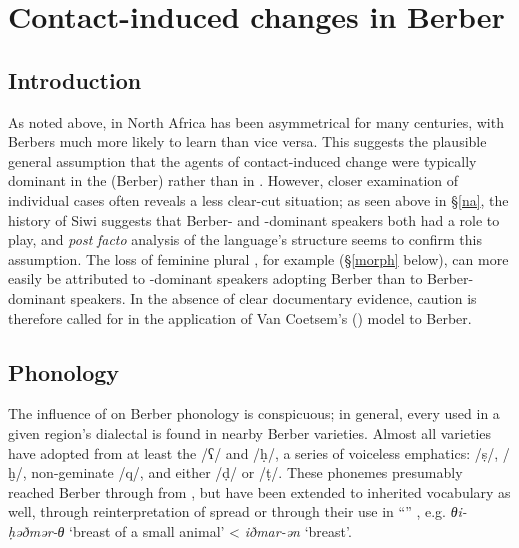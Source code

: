 \documentclass[output=paper]{langsci/langscibook}
\begin{document}
 \section{Contact-induced changes in Berber}


 \subsection{Introduction}


As noted above,  in North Africa has been asymmetrical for many centuries, with Berbers much more likely to learn  than vice versa. This suggests the plausible general assumption that the agents of contact-induced change were typically dominant in the (Berber)  rather than in .  However, closer examination of individual cases often reveals a less clear-cut situation; as seen above in §\ref{na}, the history of Siwi suggests that Berber- and -dominant speakers both had a role to play, and \textit{post} \textit{facto} analysis of the language's structure seems to confirm this assumption.  The loss of feminine plural , for example (§\ref{morph} below), can more easily be attributed to -dominant speakers adopting Berber than to Berber-dominant speakers.  In the absence of clear documentary evidence, caution is therefore called for in the application of Van Coetsem's (\citeyear{VanCoetsem1988,VanCoetsem2000}) model to Berber.


 
 \subsection{Phonology}


The influence of  on Berber phonology is conspicuous; in general, every  used in a given region's dialectal  is found in nearby Berber varieties. Almost all  varieties have adopted from  at least the  /ʕ/ and /ḥ/, a series of voiceless emphatics: /ṣ/, /ḫ/, non-geminate /q/, and either /ḍ/ or /ṭ/. These phonemes presumably reached Berber through  from , but have been extended to inherited vocabulary as well, through reinterpretation of  spread or through their use in “” \citep[199]{Kossmann2013book}, e.g.  \textit{θi-ḥəðmər-θ} `breast of a small animal' < \textit{iðmar-ən} `breast'.
\end{document}

